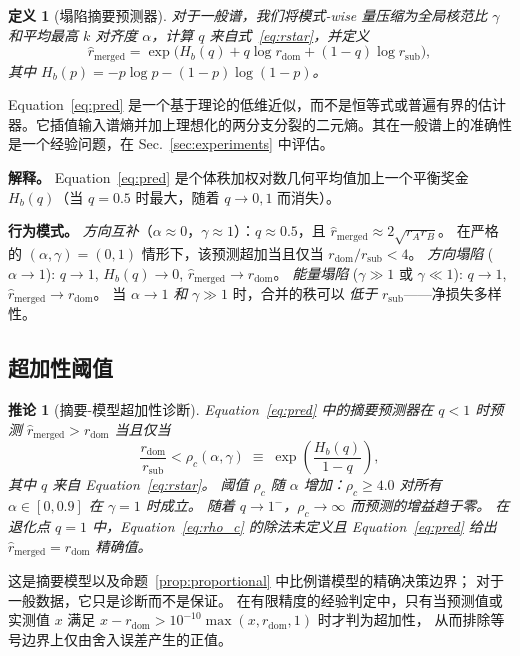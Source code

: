 \documentclass{article}
\newtheorem{corollary}[lemma]{推论}
\newtheorem{definition}{定义}
\begin{document}
\begin{definition}[塌陷摘要预测器]
\label{def:collapse}
对于一般谱，我们将模式-wise 量压缩为全局核范比 $\gamma$ 和平均最高 $k$ 对齐度 $\alpha$，计算 $q$ 来自式~\eqref{eq:rstar}，并定义
\begin{equation}
  \hat{r}_{\mathrm{merged}} =
  \exp\!\Big(H_b(q) + q\log r_{\mathrm{dom}} + (1-q)\log r_{\mathrm{sub}}\Big),
  \label{eq:pred}
\end{equation}
其中 $H_b(p)=-p\log p-(1-p)\log(1-p)$。
\end{definition}
Equation~\eqref{eq:pred} 是一个基于理论的低维近似，而不是恒等式或普遍有界的估计器。它插值输入谱熵并加上理想化的两分支分裂的二元熵。其在一般谱上的准确性是一个经验问题，在 Sec.~\ref{sec:experiments} 中评估。

\textbf{解释。}
Equation~\eqref{eq:pred} 是个体秩加权对数几何平均值加上一个平衡奖金 $H_b(q)$（当 $q{=}0.5$ 时最大，随着 $q{\to}0,1$ 而消失）。

\textbf{行为模式。}
\emph{方向互补}（$\alpha{\approx}0$，$\gamma{\approx}1$）：$q{\approx}0.5$，且
$\hat{r}_{\mathrm{merged}}{\approx}2\sqrt{r_Ar_B}$。
在严格的 $(\alpha,\gamma)=(0,1)$ 情形下，该预测超加当且仅当
$r_{\mathrm{dom}}/r_{\mathrm{sub}}<4$。
\emph{方向塌陷} ($\alpha{\to}1$): $q{\to}1$, $H_b(q){\to}0$, $\hat{r}_{\mathrm{merged}}{\to}r_{\mathrm{dom}}$。
\emph{能量塌陷} ($\gamma{\gg}1$ 或 $\gamma{\ll}1$): $q{\to}1$, $\hat{r}_{\mathrm{merged}}{\to}r_{\mathrm{dom}}$。
当 $\alpha{\to}1$ \emph{和} $\gamma{\gg}1$ 时，合并的秩可以 \emph{低于} $r_{\mathrm{sub}}$——净损失多样性。

\subsection{超加性阈值}
\label{sec:superadd}

\begin{corollary}[摘要-模型超加性诊断]
\label{cor:superadd}
Equation~\eqref{eq:pred} 中的摘要预测器在 $q<1$ 时预测
$\hat{r}_{\mathrm{merged}}>r_{\mathrm{dom}}$
当且仅当
\begin{equation}
  \frac{r_{\mathrm{dom}}}{r_{\mathrm{sub}}} < \rho_c(\alpha,\gamma)
  \;\equiv\; \exp\!\!\left(\frac{H_b(q)}{1-q}\right),
  \label{eq:rho_c}
\end{equation}
其中 $q$ 来自 Equation~\eqref{eq:rstar}。
阈值 $\rho_c$ 随 $\alpha$ 增加：$\rho_c\geq4.0$ 对所有 $\alpha\in[0,0.9]$ 在 $\gamma=1$ 时成立。
随着 $q\to1^{-}$，$\rho_c\to\infty$ 而预测的增益趋于零。
在退化点 $q=1$ 中，Equation~\eqref{eq:rho_c} 的除法未定义且 Equation~\eqref{eq:pred} 给出
$\hat r_{\mathrm{merged}}=r_{\mathrm{dom}}$ 精确值。
\end{corollary}
这是摘要模型以及命题~\ref{prop:proportional} 中比例谱模型的精确决策边界；
对于一般数据，它只是诊断而不是保证。
在有限精度的经验判定中，只有当预测值或实测值 $x$ 满足
$x-r_{\mathrm{dom}}>10^{-10}\max(x,r_{\mathrm{dom}},1)$ 时才判为超加性，
从而排除等号边界上仅由舍入误差产生的正值。
\end{document}
